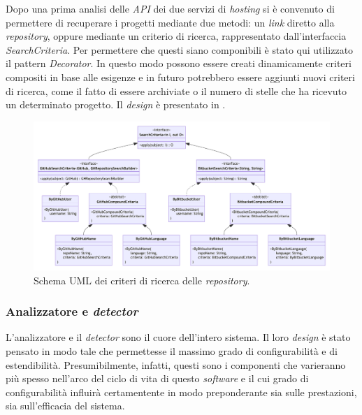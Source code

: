 Dopo una prima analisi delle \textit{API} dei due servizi di \textit{hosting} si è convenuto di permettere di recuperare i progetti mediante due metodi: un \textit{link} diretto alla \textit{repository}, oppure mediante un criterio di ricerca, rappresentato dall'interfaccia \textit{SearchCriteria}.
%
Per permettere che questi siano componibili è stato qui utilizzato il pattern \textit{Decorator}.
%
In questo modo possono essere creati dinamicamente criteri compositi in base alle esigenze e in futuro potrebbero essere aggiunti nuovi criteri di ricerca, come il fatto di essere archiviate o il numero di stelle che ha ricevuto un determinato progetto.
%
Il \textit{design} è presentato in .

\begin{figure}
    \centering
    \includegraphics[width=\textwidth]{resources/img/02-search-criteria.pdf}
    \caption{Schema UML dei criteri di ricerca delle \textit{repository}.}
    \label{img:02-search-criteria}
\end{figure}


\subsubsection*{Analizzatore e \textit{detector}}
L'analizzatore e il \textit{detector} sono il cuore dell'intero sistema.
%
Il loro \textit{design} è stato pensato in modo tale che permettesse il massimo grado di configurabilità e di estendibilità.
%
Presumibilmente, infatti, questi sono i componenti che varieranno più spesso nell'arco del ciclo di vita di questo \textit{software} e il cui grado di configurabilità influirà certamentente in modo preponderante sia sulle prestazioni, sia sull'efficacia del sistema.

